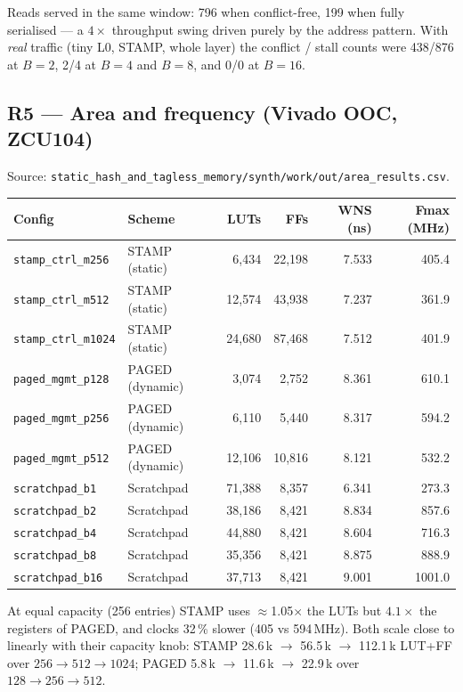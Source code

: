 \documentclass[11pt,a4paper]{article}
\newcommand{\file}[1]{\texttt{\small #1}}
\begin{document}
\noindent Reads served in the same window: 796 when conflict-free, 199 when
fully serialised --- a $4\times$ throughput swing driven purely by the address
pattern. With \emph{real} traffic (tiny L0, STAMP, whole layer) the conflict /
stall counts were 438/876 at $B{=}2$, 2/4 at $B{=}4$ and $B{=}8$, and 0/0 at
$B{=}16$.

\subsection{R5 --- Area and frequency (Vivado OOC, ZCU104)}

Source: \file{static\_hash\_and\_tagless\_memory/synth/work/out/area\_results.csv}.

\begin{center}
\small
\begin{tabular}{@{}llrrrr@{}}
\toprule
\textbf{Config} & \textbf{Scheme} & \textbf{LUTs} & \textbf{FFs} & \textbf{WNS (ns)} & \textbf{Fmax (MHz)} \\
\midrule
\file{stamp\_ctrl\_m256}  & STAMP (static)  & 6{,}434  & 22{,}198 & 7.533 & 405.4 \\
\file{stamp\_ctrl\_m512}  & STAMP (static)  & 12{,}574 & 43{,}938 & 7.237 & 361.9 \\
\file{stamp\_ctrl\_m1024} & STAMP (static)  & 24{,}680 & 87{,}468 & 7.512 & 401.9 \\
\file{paged\_mgmt\_p128}  & PAGED (dynamic) & 3{,}074  & 2{,}752  & 8.361 & 610.1 \\
\file{paged\_mgmt\_p256}  & PAGED (dynamic) & 6{,}110  & 5{,}440  & 8.317 & 594.2 \\
\file{paged\_mgmt\_p512}  & PAGED (dynamic) & 12{,}106 & 10{,}816 & 8.121 & 532.2 \\
\midrule
\file{scratchpad\_b1}     & Scratchpad      & 71{,}388 & 8{,}357 & 6.341 & 273.3 \\
\file{scratchpad\_b2}     & Scratchpad      & 38{,}186 & 8{,}421 & 8.834 & 857.6 \\
\file{scratchpad\_b4}     & Scratchpad      & 44{,}880 & 8{,}421 & 8.604 & 716.3 \\
\file{scratchpad\_b8}     & Scratchpad      & 35{,}356 & 8{,}421 & 8.875 & 888.9 \\
\file{scratchpad\_b16}    & Scratchpad      & 37{,}713 & 8{,}421 & 9.001 & 1001.0 \\
\bottomrule
\end{tabular}
\end{center}

\noindent At equal capacity (256 entries) STAMP uses $\approx$1.05$\times$ the
LUTs but $4.1\times$ the registers of PAGED, and clocks 32\,\% slower
(405 vs 594\,MHz). Both scale close to linearly with their capacity knob:
STAMP 28.6\,k $\to$ 56.5\,k $\to$ 112.1\,k LUT+FF over $256\to512\to1024$;
PAGED 5.8\,k $\to$ 11.6\,k $\to$ 22.9\,k over $128\to256\to512$.
\end{document}
